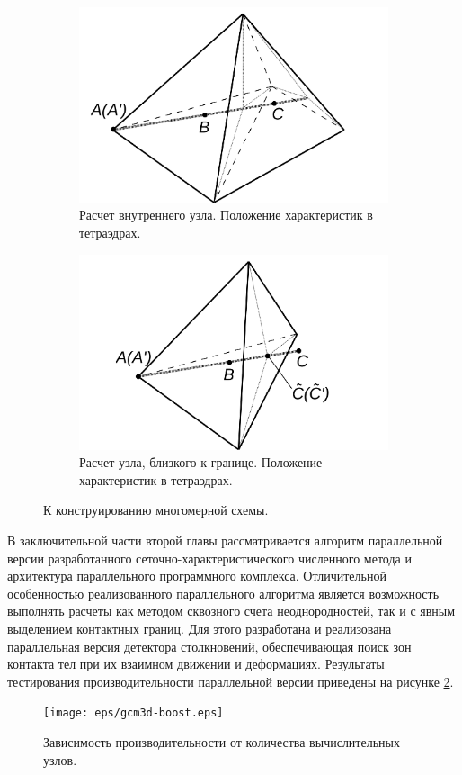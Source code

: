 \begin{figure}[ht]
\begin{subfigure}[b]{0.45\textwidth}
\centering
\includegraphics[width=\textwidth]{png/characteristics-2d-triangles-inner-2.png}
\caption{Расчет внутреннего узла. Положение характеристик в тетраэдрах.}
\end{subfigure}
\begin{subfigure}[b]{0.45\textwidth}
\centering
\includegraphics[width=\textwidth]{png/characteristics-2d-triangles-semi-border-2.png}
\caption{Расчет узла, близкого к границе. Положение характеристик в тетраэдрах.}
\end{subfigure}
\caption{К конструированию многомерной схемы.}
\label{pic:method_3d}
\end{figure}

В заключительной части второй главы рассматривается алгоритм параллельной версии разработанного сеточно-характеристического численного метода и архитектура параллельного программного комплекса. Отличительной особенностью реализованного параллельного алгоритма является возможность выполнять расчеты как методом сквозного счета неоднородностей, так и с явным выделением контактных границ. Для этого разработана и реализована параллельная версия детектора столкновений, обеспечивающая поиск зон контакта тел при их взаимном движении и деформациях. Результаты тестирования производительности параллельной версии приведены на рисунке \ref{pic:gcm_boost}.
\begin{figure}[htp]
\centering
\texttt{[image: eps/gcm3d-boost.eps]}
\caption{Зависимость производительности от количества вычислительных узлов.}
\label{pic:gcm_boost}
\end{figure}

